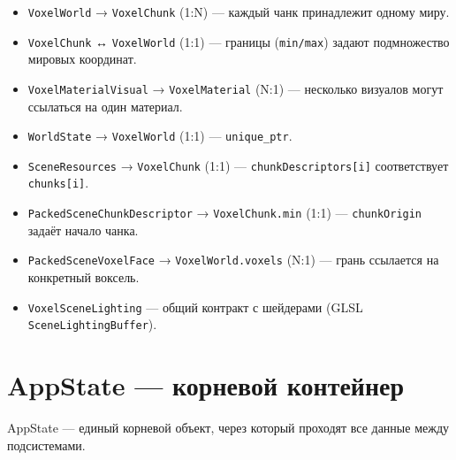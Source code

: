 \begin{itemize}
\tightlist
\item
  \texttt{VoxelWorld} → \texttt{VoxelChunk} (1:N) --- каждый чанк принадлежит одному миру.
\item
  \texttt{VoxelChunk} ↔ \texttt{VoxelWorld} (1:1) --- границы (\texttt{min/max}) задают подмножество мировых координат.
\item
  \texttt{VoxelMaterialVisual} → \texttt{VoxelMaterial} (N:1) --- несколько визуалов могут ссылаться на один материал.
\item
  \texttt{WorldState} → \texttt{VoxelWorld} (1:1) --- \texttt{unique\_ptr}.
\item
  \texttt{SceneResources} → \texttt{VoxelChunk} (1:1) --- \texttt{chunkDescriptors{[}i{]}} соответствует \texttt{chunks{[}i{]}}.
\item
  \texttt{PackedSceneChunkDescriptor} → \texttt{VoxelChunk.min} (1:1) --- \texttt{chunkOrigin} задаёт начало чанка.
\item
  \texttt{PackedSceneVoxelFace} → \texttt{VoxelWorld.voxels} (N:1) --- грань ссылается на конкретный воксель.
\item
  \texttt{VoxelSceneLighting} --- общий контракт с шейдерами (GLSL \texttt{SceneLightingBuffer}).
\end{itemize}

\section{AppState --- корневой контейнер}\label{KT-2.1_Architecture-appstate--ux43aux43eux440ux43dux435ux432ux43eux439-ux43aux43eux43dux442ux435ux439ux43dux435ux440}

AppState --- единый корневой объект, через который проходят все данные между подсистемами.

